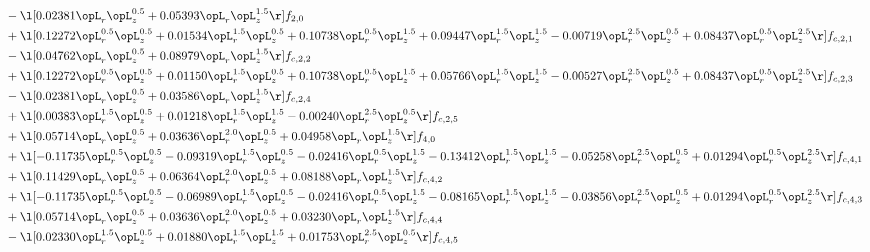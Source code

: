 \begin{alignat}{2}
& - \l[  0.02381 \opL_r \opL_z^{0.5} +  0.05393 \opL_r \opL_z^{1.5}  \r] f_{2,0} \nonumber \\ 
& + \l[  0.12272 \opL_r^{0.5} \opL_z^{0.5} +  0.01534 \opL_r^{1.5} \opL_z^{0.5} +  0.10738 \opL_r^{0.5} \opL_z^{1.5} +  0.09447 \opL_r^{1.5} \opL_z^{1.5}   -0.00719 \opL_r^{2.5} \opL_z^{0.5} +  0.08437 \opL_r^{0.5} \opL_z^{2.5}  \r] f_{c,2,1} \nonumber \\ 
& - \l[  0.04762 \opL_r \opL_z^{0.5} +  0.08979 \opL_r \opL_z^{1.5}  \r] f_{c,2,2} \nonumber \\ 
& + \l[  0.12272 \opL_r^{0.5} \opL_z^{0.5} +  0.01150 \opL_r^{1.5} \opL_z^{0.5} +  0.10738 \opL_r^{0.5} \opL_z^{1.5} +  0.05766 \opL_r^{1.5} \opL_z^{1.5}   -0.00527 \opL_r^{2.5} \opL_z^{0.5} +  0.08437 \opL_r^{0.5} \opL_z^{2.5}  \r] f_{c,2,3} \nonumber \\ 
& - \l[  0.02381 \opL_r \opL_z^{0.5} +  0.03586 \opL_r \opL_z^{1.5}  \r] f_{c,2,4} \nonumber \\ 
& + \l[  0.00383 \opL_r^{1.5} \opL_z^{0.5} +  0.01218 \opL_r^{1.5} \opL_z^{1.5}   -0.00240 \opL_r^{2.5} \opL_z^{0.5}  \r] f_{c,2,5} \nonumber \\ 
& + \l[  0.05714 \opL_r \opL_z^{0.5} +  0.03636 \opL_r^{2.0} \opL_z^{0.5} +  0.04958 \opL_r \opL_z^{1.5}  \r] f_{4,0} \nonumber \\ 
& + \l[  -0.11735 \opL_r^{0.5} \opL_z^{0.5}   -0.09319 \opL_r^{1.5} \opL_z^{0.5}   -0.02416 \opL_r^{0.5} \opL_z^{1.5}   -0.13412 \opL_r^{1.5} \opL_z^{1.5}   -0.05258 \opL_r^{2.5} \opL_z^{0.5} +  0.01294 \opL_r^{0.5} \opL_z^{2.5}  \r] f_{c,4,1} \nonumber \\ 
& + \l[  0.11429 \opL_r \opL_z^{0.5} +  0.06364 \opL_r^{2.0} \opL_z^{0.5} +  0.08188 \opL_r \opL_z^{1.5}  \r] f_{c,4,2} \nonumber \\ 
& + \l[  -0.11735 \opL_r^{0.5} \opL_z^{0.5}   -0.06989 \opL_r^{1.5} \opL_z^{0.5}   -0.02416 \opL_r^{0.5} \opL_z^{1.5}   -0.08165 \opL_r^{1.5} \opL_z^{1.5}   -0.03856 \opL_r^{2.5} \opL_z^{0.5} +  0.01294 \opL_r^{0.5} \opL_z^{2.5}  \r] f_{c,4,3} \nonumber \\ 
& + \l[  0.05714 \opL_r \opL_z^{0.5} +  0.03636 \opL_r^{2.0} \opL_z^{0.5} +  0.03230 \opL_r \opL_z^{1.5}  \r] f_{c,4,4} \nonumber \\ 
& - \l[  0.02330 \opL_r^{1.5} \opL_z^{0.5} +  0.01880 \opL_r^{1.5} \opL_z^{1.5} +  0.01753 \opL_r^{2.5} \opL_z^{0.5}  \r] f_{c,4,5} \nonumber \\ 
\end{alignat} 


